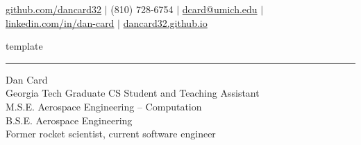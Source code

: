 \documentclass[11pt]{article}%
\begin{document}
	\vspace{0.5in}
	\begin{minipage}[h]{\linewidth}
		\begin{center}
			\small
			\href{https://github.com/dancard32}{github.com/dancard32}
			$\rvert$
			(810) 728-6754 $\rvert$
			\href{mailto:dcard@umich.edu}{dcard@umich.edu} $\rvert$
			\href{https://www.linkedin.com/in/dan-card/}{linkedin.com/in/dan-card} $\rvert$
			\href{https://dancard32.github.io/website/#/home}{dancard32.github.io}
		\end{center}
	\end{minipage}

	{template}

	\vspace{-10pt}

	{\textcolor{SectionColor}{\rule{4cm}{1pt}}}

	\textcolor{SectionColor}{Dan Card}\\
	\textcolor{SectionColor}{Georgia Tech Graduate CS Student and Teaching Assistant}\\
	\textcolor{SectionColor}{M.S.E. Aerospace Engineering -- Computation}\\
	\textcolor{SectionColor}{B.S.E. Aerospace Engineering}\\
	\textcolor{SectionColor}{Former rocket scientist, current software engineer}
\end{document}

